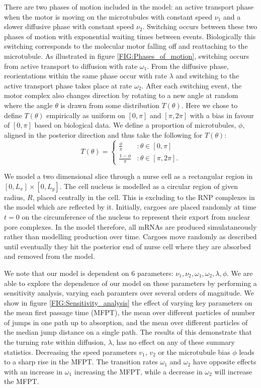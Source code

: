 \documentclass[twocolumn]{biophys}
\begin{document}
There are two phases of motion included in the model: an active transport phase when the motor is moving on the microtubules with constant speed $\nu_1$ and a slower diffusive phase with constant speed $\nu_2$.
Switching occurs between these two phases of motion with exponential waiting times between events.
Biologically this switching corresponds to the molecular motor falling off and reattaching to the microtubule.
As illustrated in figure \ref{FIG:Phases_of_motion}, switching occurs from active transport to diffusion with rate $\omega_1$. 
From the diffusive phase, reorientations within the same phase occur with rate $\lambda$ and switching to the active transport phase takes place at rate $\omega_2$. 
After each switching event, the motor complex also changes direction by rotating to a new angle at random where the angle $\theta $ is drawn from some distribution $T(\theta)$. 
Here we chose to define $T(\theta)$ empirically as uniform on $[0,\pi ]$ and $[\pi, 2\pi ]$ with a bias in favour of $[0,\pi ]$ based on biological data.
We define a proportion of microtubules, $\phi$, aligned in the posterior direction and thus take the following for $T(\theta)$:
\begin{equation*}         
T(\theta) = \begin{cases} \frac{\phi}{\pi} & : \theta \in [0,\pi] \\ \frac{1-\phi}{\pi} & : \theta \in [\pi,2\pi].                       
\end{cases}
\end{equation*}

We model a two dimensional slice through a nurse cell as a rectangular region in $[0,L_x] \times [0,L_y]$.
The cell nucleus is modelled as a circular region of given radius, $R$, placed centrally in the cell. 
This is excluding to the RNP complexes in the model which are reflected by it.
Initially, cargoes are placed randomly at time $t=0$ on the circumference of the nucleus to represent their export from nuclear pore complexes.
In the model therefore, all mRNAs are produced simulataneously rather than modelling production over time.
Cargoes move randomly as described until eventually they hit the posterior end of nurse cell where they are absorbed and removed from the model.

We note that our model is dependent on 6 parameters: $\nu_1, \nu_2, \omega_1, \omega_2, \lambda, \phi$. 
We are able to explore the dependence of our model on these parameters by performing a sensitivity analysis, varying each paramters over several orders of magnitude.
We show  in figure \ref{FIG:Sensitivity_analysis} the effect of varying key parameters on the mean first passage time (MFPT), the mean over different particles of number of jumps in one path up to absorption, and the mean over different particles of the median jump distance on a single path.
The results of this demonstrate that the turning rate within diffusion, $\lambda$, has no effect on any of these summary statistics. Decreasing the speed parameters $v_1$, $v_2$ or the microtubule bias $\phi$ leads to a sharp rise in the MFPT. 
The transition rates $\omega_1$ and $\omega_2$ have opposite effects with an increase in $\omega_1$ increasing the MFPT, while a decrease in $\omega_2$ will increase the MFPT.
\end{document}
